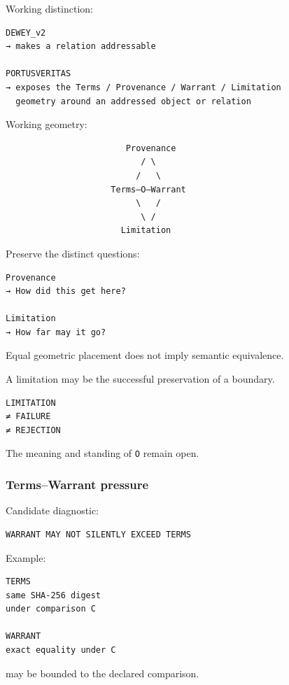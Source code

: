 Working distinction:

\begin{verbatim}
DEWEY_v2
→ makes a relation addressable

PORTUSVERITAS
→ exposes the Terms / Provenance / Warrant / Limitation
  geometry around an addressed object or relation
\end{verbatim}

Working geometry:

\begin{verbatim}
                        Provenance
                           / \
                          /   \
                     Terms—O—Warrant
                          \   /
                           \ /
                       Limitation
\end{verbatim}

Preserve the distinct questions:

\begin{verbatim}
Provenance
→ How did this get here?

Limitation
→ How far may it go?
\end{verbatim}

Equal geometric placement does not imply semantic equivalence.

A limitation may be the successful preservation of a boundary.

\begin{verbatim}
LIMITATION
≠ FAILURE
≠ REJECTION
\end{verbatim}

The meaning and standing of \texttt{O} remain open.

\subsubsection{Terms--Warrant pressure}\label{termswarrant-pressure}

Candidate diagnostic:

\begin{verbatim}
WARRANT MAY NOT SILENTLY EXCEED TERMS
\end{verbatim}

Example:

\begin{verbatim}
TERMS
same SHA-256 digest
under comparison C

WARRANT
exact equality under C
\end{verbatim}

may be bounded to the declared comparison.

